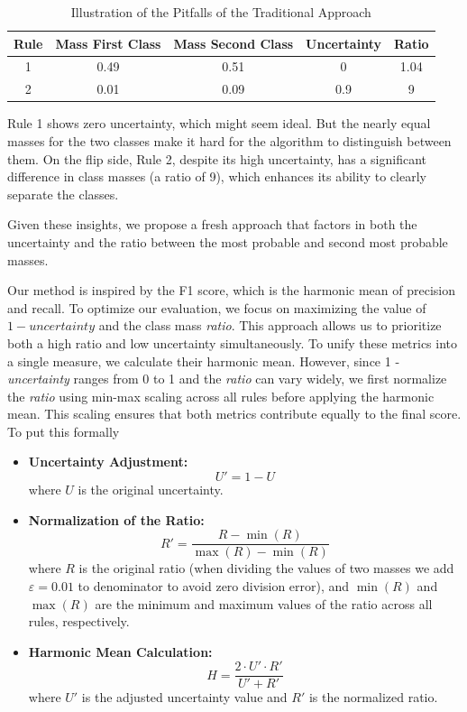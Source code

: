 \documentclass[10pt,a4paper,oneside]{article}
\begin{document}
\begin{table}[ht]
    \centering
    \begin{tabular}{c|c|c|c|c}
        \toprule
        \textbf{Rule} & \textbf{Mass First Class} & \textbf{Mass Second Class} & \textbf{Uncertainty} & \textbf{Ratio} \\
        \midrule
        1 & 0.49 & 0.51 & 0 & 1.04 \\
        2 & 0.01 & 0.09 & 0.9 & 9 \\
        \bottomrule
    \end{tabular}
    \caption{Illustration of the Pitfalls of the Traditional Approach}
    \label{table-pitfalls}
\end{table}
\newpage
Rule 1 shows zero uncertainty, which might seem ideal. But the nearly equal masses for the two classes make it hard for the algorithm to distinguish between them. On the flip side, Rule 2, despite its high uncertainty, has a significant difference in class masses (a ratio of 9), which enhances its ability to clearly separate the classes.

Given these insights, we propose a fresh approach that factors in both the uncertainty and the ratio between the most probable and second most probable masses.

Our method is inspired by the F1 score, which is the harmonic mean of precision and recall. To optimize our evaluation, we focus on maximizing the value of $1 - \textit{uncertainty}$ and the class mass \textit{ratio}. This approach allows us to prioritize both a high ratio and low uncertainty simultaneously. To unify these metrics into a single measure, we calculate their harmonic mean. However, since 1 - \textit{uncertainty} ranges from 0 to 1 and the \textit{ratio} can vary widely, we first normalize the \textit{ratio} using min-max scaling across all rules before applying the harmonic mean. This scaling ensures that both metrics contribute equally to the final score.
To put this formally 
\begin{itemize}
    \item \textbf{Uncertainty Adjustment:}
    \[
    U' = 1 - U
    \]
    where \( U \) is the original uncertainty.

    \item \textbf{Normalization of the Ratio:}
    \[
    R' = \frac{R - \min(R)}{\max(R) - \min(R)}
    \]
    where \( R \) is the original ratio (when dividing the values of two masses we add $\varepsilon=0.01$ to denominator to avoid zero division error), and \( \min(R) \) and \( \max(R) \) are the minimum and maximum values of the ratio across all rules, respectively.

    \item \textbf{Harmonic Mean Calculation:}
    \[
    H = \frac{2 \cdot U' \cdot R'}{U' + R'}
    \]
    where \( U' \) is the adjusted uncertainty value and \( R' \) is the normalized ratio.
\end{itemize}
\end{document}
